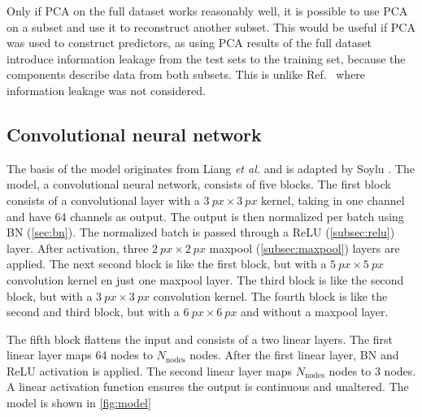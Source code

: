 Only if PCA on the full dataset works reasonably well, it is possible to use PCA on a subset and use it to reconstruct another subset.
This would be useful if PCA was used to construct predictors, as using PCA results of the full dataset introduce information leakage from the test sets to the training set, because the components describe data from both subsets.
This is unlike Ref.~\cite{Soylu2022} where information leakage was not considered.

\subsection{Convolutional neural network}
The basis of the model originates from Liang \emph{et al.} \cite{Liang2017} and is adapted by Soylu \cite{Soylu2022}.
The model, a convolutional neural network, consists of five blocks.
The first block consists of a convolutional layer with a $\qty{3}{px}\times\qty{3}{px}$ kernel, taking in one channel and have 64 channels as output.
The output is then normalized per batch using BN (\cref{sec:bn}).
The normalized batch is passed through a ReLU (\cref{subsec:relu}) layer.
After activation, three $\qty{2}{px}\times\qty{2}{px}$ maxpool (\cref{subsec:maxpool}) layers are applied.
The next second block is like the first block, but with a $\qty{5}{px}\times\qty{5}{px}$ convolution kernel en just one maxpool layer.
The third block is like the second block, but with a $\qty{3}{px}\times\qty{3}{px}$ convolution kernel.
The fourth block is like the second and third block, but with a $\qty{6}{px}\times\qty{6}{px}$ and without a maxpool layer.

The fifth block flattens the input and consists of a two linear layers.
The first linear layer maps 64 nodes to $N_\mathrm{nodes}$ nodes.
After the first linear layer, BN and ReLU activation is applied.
The second linear layer maps $N_\mathrm{nodes}$ nodes to 3 nodes.
A linear activation function ensures the output is continuous and unaltered.
The model is shown in \cref{fig:model}

